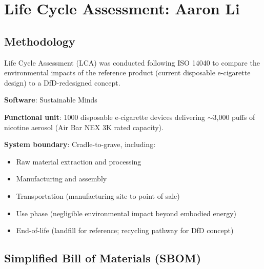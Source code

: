 \section{Life Cycle Assessment: Aaron Li}
\label{sec:lca}

\subsection{Methodology}

Life Cycle Assessment (LCA) was conducted following ISO 14040 to compare the environmental impacts of the reference product (current disposable e-cigarette design) to a DfD-redesigned concept.

\textbf{Software}: Sustainable Minds

\textbf{Functional unit}: 1000 disposable e-cigarette devices delivering $\sim$3{,}000 puffs of nicotine aerosol (Air Bar NEX 3K rated capacity).

\textbf{System boundary}: Cradle-to-grave, including:

\begin{itemize}
    \item Raw material extraction and processing
    \item Manufacturing and assembly
    \item Transportation (manufacturing site to point of sale)
    \item Use phase (negligible environmental impact beyond embodied energy)
    \item End-of-life (landfill for reference; recycling pathway for DfD concept)
\end{itemize}

\subsection{Simplified Bill of Materials (SBOM)}

